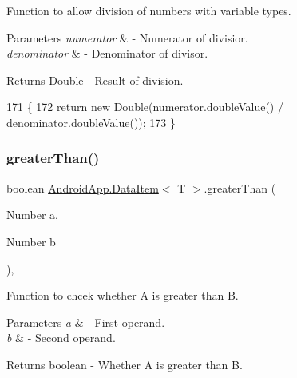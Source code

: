 Function to allow division of numbers with variable types. 


\begin{DoxyParams}{Parameters}
{\em numerator} & -\/ Numerator of divisior. \\
\hline
{\em denominator} & -\/ Denominator of divisor. \\
\hline
\end{DoxyParams}
\begin{DoxyReturn}{Returns}
Double -\/ Result of division. 
\end{DoxyReturn}

\begin{DoxyCode}
171                                                                 \{
172         \textcolor{keywordflow}{return} \textcolor{keyword}{new} Double(numerator.doubleValue() / denominator.doubleValue());
173     \}
\end{DoxyCode}
\mbox{\label{class_android_app_1_1_data_item_ab7fc2c1c68ba314ce4131e3e761aef2e}} 
\subsubsection{\texorpdfstring{greater\+Than()}{greaterThan()}}
{\footnotesize\ttfamily boolean \hyperlink{class_android_app_1_1_data_item}{Android\+App.\+Data\+Item}$<$ T $>$.greater\+Than (\begin{DoxyParamCaption}\item[{Number}]{a,  }\item[{Number}]{b }\end{DoxyParamCaption})\hspace{0.3cm}{\ttfamily [inline]}, {\ttfamily [private]}}



Function to chcek whether A is greater than B. 


\begin{DoxyParams}{Parameters}
{\em a} & -\/ First operand. \\
\hline
{\em b} & -\/ Second operand. \\
\hline
\end{DoxyParams}
\begin{DoxyReturn}{Returns}
boolean -\/ Whether A is greater than B. 
\end{DoxyReturn}

